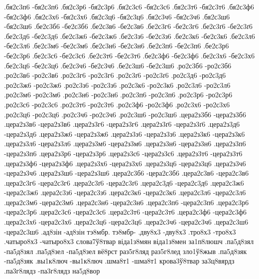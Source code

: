 {.бя2с3п6 -бя2с3п6
.бя2с3р6 -бя2с3р6
.бя2с3с6 -бя2с3с6
.бя2с3т6 -бя2с3т6
.бя2с3ф6 -бя2с3ф6
.бя2с3х6 -бя2с3х6
.бя2с3ц6 -бя2с3ц6
.бя2с3ч6 -бя2с3ч6
.бя2с3ш6 -бя2с3ш6
.бе2с3б6 -бе2с3б6
.бе2с3в6 -бе2с3в6
.бе2с3г6 -бе2с3г6
.бе2с3ґ6 -бе2с3ґ6
.бе2с3д6 -бе2с3д6
.бе2с3ж6 -бе2с3ж6
.бе2с3з6 -бе2с3з6
.бе2с3к6 -бе2с3к6
.бе2с3л6 -бе2с3л6
.бе2с3м6 -бе2с3м6
.бе2с3н6 -бе2с3н6
.бе2с3п6 -бе2с3п6
.бе2с3р6 -бе2с3р6
.бе2с3с6 -бе2с3с6
.бе2с3т6 -бе2с3т6
.бе2с3ф6 -бе2с3ф6
.бе2с3х6 -бе2с3х6
.бе2с3ц6 -бе2с3ц6
.бе2с3ч6 -бе2с3ч6
.бе2с3ш6 -бе2с3ш6
.ро2с3б6 -ро2с3б6
.ро2с3в6 -ро2с3в6
.ро2с3г6 -ро2с3г6
.ро2с3ґ6 -ро2с3ґ6
.ро2с3д6 -ро2с3д6
.ро2с3ж6 -ро2с3ж6
.ро2с3з6 -ро2с3з6
.ро2с3к6 -ро2с3к6
.ро2с3л6 -ро2с3л6
.ро2с3м6 -ро2с3м6
.ро2с3н6 -ро2с3н6
.ро2с3п6 -ро2с3п6
.ро2с3р6 -ро2с3р6
.ро2с3с6 -ро2с3с6
.ро2с3т6 -ро2с3т6
.ро2с3ф6 -ро2с3ф6
.ро2с3х6 -ро2с3х6
.ро2с3ц6 -ро2с3ц6
.ро2с3ч6 -ро2с3ч6
.ро2с3ш6 -ро2с3ш6
.цера2з3б6 -цера2з3б6
.цера2з3в6 -цера2з3в6
.цера2з3г6 -цера2з3г6
.цера2з3ґ6 -цера2з3ґ6
.цера2з3д6 -цера2з3д6
.цера2з3ж6 -цера2з3ж6
.цера2з3з6 -цера2з3з6
.цера2з3к6 -цера2з3к6
.цера2з3л6 -цера2з3л6
.цера2з3м6 -цера2з3м6
.цера2з3н6 -цера2з3н6
.цера2з3п6 -цера2з3п6
.цера2з3р6 -цера2з3р6
.цера2з3с6 -цера2з3с6
.цера2з3т6 -цера2з3т6
.цера2з3ф6 -цера2з3ф6
.цера2з3х6 -цера2з3х6
.цера2з3ц6 -цера2з3ц6
.цера2з3ч6 -цера2з3ч6
.цера2з3ш6 -цера2з3ш6
.цера2с3б6 -цера2с3б6
.цера2с3в6 -цера2с3в6
.цера2с3г6 -цера2с3г6
.цера2с3ґ6 -цера2с3ґ6
.цера2с3д6 -цера2с3д6
.цера2с3ж6 -цера2с3ж6
.цера2с3з6 -цера2с3з6
.цера2с3к6 -цера2с3к6
.цера2с3л6 -цера2с3л6
.цера2с3м6 -цера2с3м6
.цера2с3н6 -цера2с3н6
.цера2с3п6 -цера2с3п6
.цера2с3р6 -цера2с3р6
.цера2с3с6 -цера2с3с6
.цера2с3т6 -цера2с3т6
.цера2с3ф6 -цера2с3ф6
.цера2с3х6 -цера2с3х6
.цера2с3ц6 -цера2с3ц6
.цера2с3ч6 -цера2с3ч6
.цера2с3ш6 -цера2с3ш6
%
%
%
.ад8зін -ад8зін
тэ8мбр. тэ8мбр-
.дву8х3 -дву8х3
.тро8х3 -тро8х3
.чатыро8х3 -чатыро8х3
слова7ў8твар
віда1з8мян
віда1з8мен
за1п8люшч
.па5д8зял -па5д8зял
.па5д8зел -па5д8зел
вё8рст
раз5г8ляд
раз5г8лед
зло1ў8жыв
.па5д8зяк -па5д8зяк
.вы1к8люч -вы1к8люч
.шма8т1 -шма8т1
крова3ў8твар
за3ц8вярдз
.па3г8лядз -па3г8лядз
на5д8вор
}

